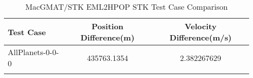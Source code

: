 \begin{table}[htbp!]
\centering
\caption{ MacGMAT/STK EML2HPOP STK Test Case Comparison}
      \begin{tabular}{lcc}
      \hline\hline
          Test Case & Position Difference(m) & Velocity Difference(m/s) \\
         \hline
         AllPlanets-0-0-0 & 435763.1354 & 2.382267629 \\
      \hline\hline
      \label{Table: EML2HPOP STK Table} 
\end{tabular}
\end{table}
